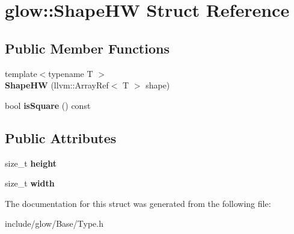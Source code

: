 \hypertarget{structglow_1_1_shape_h_w}{}\section{glow\+:\+:Shape\+HW Struct Reference}
\label{structglow_1_1_shape_h_w}
\subsection*{Public Member Functions}
\begin{DoxyCompactItemize}
\item 
\mbox{\label{structglow_1_1_shape_h_w_ad0540729040a5db862012d61372d8e97}} 
{\footnotesize template$<$typename T $>$ }\\{\bfseries Shape\+HW} (llvm\+::\+Array\+Ref$<$ T $>$ shape)
\item 
\mbox{\label{structglow_1_1_shape_h_w_ab56d22e7ffe850ec402b95016a3107cb}} 
bool {\bfseries is\+Square} () const
\end{DoxyCompactItemize}
\subsection*{Public Attributes}
\begin{DoxyCompactItemize}
\item 
\mbox{\label{structglow_1_1_shape_h_w_a50446f50e712b9586b2c9c7749523888}} 
size\+\_\+t {\bfseries height}
\item 
\mbox{\label{structglow_1_1_shape_h_w_af35b31f4ea3eb34bb77905209bf5ccf4}} 
size\+\_\+t {\bfseries width}
\end{DoxyCompactItemize}


The documentation for this struct was generated from the following file\+:\begin{DoxyCompactItemize}
\item 
include/glow/\+Base/Type.\+h\end{DoxyCompactItemize}

